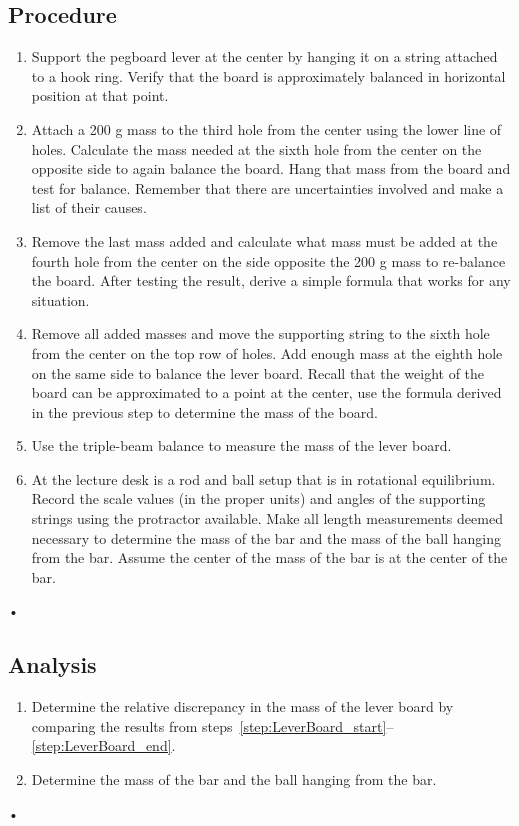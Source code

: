\documentclass[main.tex]{subfiles}
\begin{document}
\subsection*{Procedure}
\begin{enumerate}
\item
Support the pegboard lever at the center by hanging it on a string attached to a hook ring. Verify that the board is approximately balanced in horizontal position at that point.
\item
Attach a 200 g mass to the third hole from the center using the lower line of holes. Calculate the mass needed at the sixth hole from the center on the opposite side to again balance the board. Hang that mass from the board and test for balance. Remember that there are uncertainties involved and make a list of their causes.
\item
Remove the last mass added and calculate what mass must be added at the fourth hole from the center on the side opposite the 200 g mass to re-balance the board. After testing the result, derive a simple formula that works for any situation.
\item \label{step:LeverBoard_start}
Remove all added masses and move the supporting string to the sixth hole from the center on the top row of holes. Add enough mass at the eighth hole on the same side to balance the lever board. Recall that the weight of the board can be approximated to a point at the center, use the formula derived in the previous step to determine  the mass of the board.
\item \label{step:LeverBoard_end}
Use the triple-beam balance to measure the mass of the lever board.
\item
At the lecture desk is a rod and ball setup that is in rotational equilibrium. Record the scale values (in the proper units) and angles of the supporting strings using the protractor available. Make all length measurements deemed necessary to determine the mass of the bar and the mass of the ball hanging from the bar. Assume the center of the mass of the bar is at the center of the bar.
\end{enumerate}•

\subsection*{Analysis}
\begin{enumerate}
\item
Determine the relative discrepancy in the mass of the lever board by comparing the results from steps~\ref{step:LeverBoard_start}--\ref{step:LeverBoard_end}.
\item
Determine the mass of the bar and the ball hanging from the bar.
\end{enumerate}•
\end{document}
